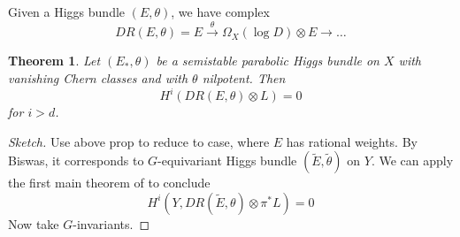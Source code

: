 \documentclass{amsart}
\newtheorem{thm}{Theorem}[section]
\newtheorem{lemma}[thm]{Lemma}
\DeclareMathOperator*{\parc}{par-c}
\newcommand {\R} {{\mathbb R}}
\newcommand {\Q} {{\mathbb Q}}
\begin{document}
Given a Higgs bundle $(E,\theta)$, we have complex
$$DR(E,\theta) = E\stackrel{\theta}{\to} \Omega_X(\log D)\otimes E\to \ldots$$

\begin{thm}
 Let $(E_*,\theta)$ be a  semistable parabolic Higgs bundle on $X$ with vanishing Chern classes and with $\theta$ nilpotent.
 Then
 $$H^i(DR(E,\theta)\otimes L)=0$$
 for $i>d$.
\end{thm}
 
 
 
\begin{proof}[Sketch]
 

{\color{red}
 Use above prop to reduce to case, where $E$ has rational weights.
By Biswas, it 
corresponds to $G$-equivariant Higgs bundle $(\tilde E,\tilde \theta)$ on $Y$.
We can apply the first main theorem of \cite{arapura} to conclude
$$H^i(Y, DR(\tilde E,\theta)\otimes \pi^*L)=0$$
Now take $G$-invariants.}
\end{proof}

%
%
%
\end{document}
